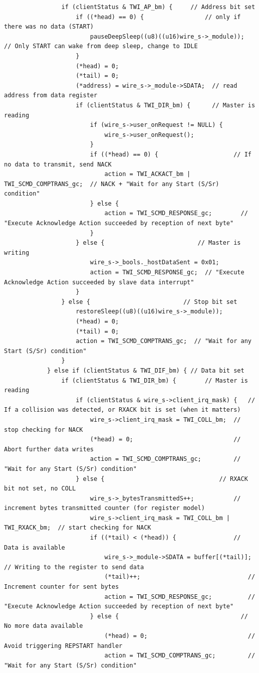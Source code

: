 \documentclass[11pt,a4paper,titlepage]{report}
\begin{document}
\begin{lstlisting}
				if (clientStatus & TWI_AP_bm) {     // Address bit set
					if ((*head) == 0) {                 // only if there was no data (START)
						pauseDeepSleep((u8)((u16)wire_s->_module));  // Only START can wake from deep sleep, change to IDLE
					}
					(*head) = 0;
					(*tail) = 0;
					(*address) = wire_s->_module->SDATA;  // read address from data register
					if (clientStatus & TWI_DIR_bm) {      // Master is reading
						if (wire_s->user_onRequest != NULL) {
							wire_s->user_onRequest();
						}
						if ((*head) == 0) {                     // If no data to transmit, send NACK
							action = TWI_ACKACT_bm | TWI_SCMD_COMPTRANS_gc;  // NACK + "Wait for any Start (S/Sr) condition"
						} else {
							action = TWI_SCMD_RESPONSE_gc;        // "Execute Acknowledge Action succeeded by reception of next byte"
						}
					} else {                          // Master is writing
						wire_s->_bools._hostDataSent = 0x01;
						action = TWI_SCMD_RESPONSE_gc;  // "Execute Acknowledge Action succeeded by slave data interrupt"
					}
				} else {                          // Stop bit set
					restoreSleep((u8)((u16)wire_s->_module));
					(*head) = 0;
					(*tail) = 0;
					action = TWI_SCMD_COMPTRANS_gc;  // "Wait for any Start (S/Sr) condition"
				}
			} else if (clientStatus & TWI_DIF_bm) { // Data bit set
				if (clientStatus & TWI_DIR_bm) {        // Master is reading
					if (clientStatus & wire_s->client_irq_mask) {   // If a collision was detected, or RXACK bit is set (when it matters)
						wire_s->client_irq_mask = TWI_COLL_bm;  // stop checking for NACK
						(*head) = 0;                            // Abort further data writes
						action = TWI_SCMD_COMPTRANS_gc;         // "Wait for any Start (S/Sr) condition"
					} else {                                // RXACK bit not set, no COLL
						wire_s->_bytesTransmittedS++;           // increment bytes transmitted counter (for register model)
						wire_s->client_irq_mask = TWI_COLL_bm | TWI_RXACK_bm;  // start checking for NACK
						if ((*tail) < (*head)) {                // Data is available
							wire_s->_module->SDATA = buffer[(*tail)];  // Writing to the register to send data
							(*tail)++;                              // Increment counter for sent bytes
							action = TWI_SCMD_RESPONSE_gc;          // "Execute Acknowledge Action succeeded by reception of next byte"
						} else {                                  // No more data available
							(*head) = 0;                            // Avoid triggering REPSTART handler
							action = TWI_SCMD_COMPTRANS_gc;         // "Wait for any Start (S/Sr) condition"

\end{lstlisting}
\end{document}
